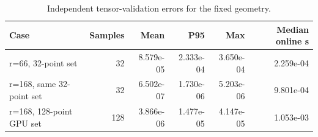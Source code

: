 \begin{table}
\centering
\small
\caption{Independent tensor-validation errors for the fixed geometry.}
\label{tab:validation}
\begin{tabular}{lrrrrr}
\toprule
Case & Samples & Mean & P95 & Max & Median online s \\
\midrule
r=66, 32-point set & 32 & 8.579e-05 & 2.333e-04 & 3.650e-04 & 2.259e-04 \\
r=168, same 32-point set & 32 & 6.502e-07 & 1.730e-06 & 5.203e-06 & 9.801e-04 \\
r=168, 128-point GPU set & 128 & 3.866e-06 & 1.477e-05 & 4.147e-05 & 1.053e-03 \\
\bottomrule
\end{tabular}
\end{table}
